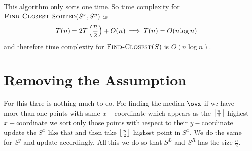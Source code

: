 This algorithm only sorts one time. So time complexity for $\textsc{Find-Closest-Sorted}(S^x,S^y)$ is $$T(n)=2T\left(\frac{n}{2}\right)+O(n)\implies T(n)=O(n\log n)$$and therefore time complexity for $\textsc{Find-Closest}(S)$ is $O(n\log n)$.

\section{Removing the Assumption}
For this there is nothing much to do. For finding the median $\ovx$ if we have more than one points with same $x-$coordinate which appears as the $\left\lfloor \frac{n}{2}\right\rfloor$ highest $x-$coordinate we sort only those points with respect to their $y-$coordinate update the $S^x$ like that and then take $\left\lfloor \frac{n}{2}\right\rfloor$ highest point in $S^x$. We do the same for $S^y$ and update accordingly. All this we do so that $S^L$ and $S^R$ has the size $\frac{n}{2}$.
